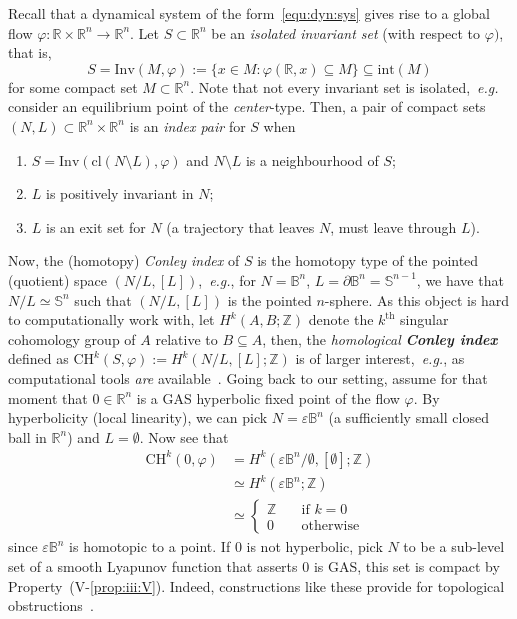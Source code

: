 \documentclass[letterpaper, 10 pt, conference]{ieeeconf}  %
\theoremstyle{mystyle}
\begin{document}
Recall that a dynamical system of the form~\eqref{equ:dyn:sys} gives rise to a global flow $\varphi:\mathbb{R}\times \mathbb{R}^n\to \mathbb{R}^n$. Let $S\subset \mathbb{R}^n$ be an \textit{isolated invariant set} (with respect to $\varphi)$, that is,
\begin{equation*}
    S = \mathrm{Inv}(M,\varphi):=\{x\in M:\varphi(\mathbb{R},x)\subseteq M\}\subseteq \mathrm{int}(M)
\end{equation*}
for some compact set $M\subset \mathbb{R}^n$. Note that not every invariant set is isolated,~\textit{e.g.} consider an equilibrium point of the \textit{center}-type. Then, a pair of compact sets $(N,L)\subset \mathbb{R}^n\times \mathbb{R}^n$ is an \textit{index pair} for $S$ when
\begin{enumerate}[({I}-i)]
    \item $S=\mathrm{Inv}(\mathrm{cl}(N\setminus L),\varphi)$ and $N\setminus L$ is a neighbourhood of $S$;
    \item $L$ is positively invariant in $N$;
    \item $L$ is an exit set for $N$ (a trajectory that leaves $N$, must leave through $L$).
\end{enumerate}
Now, the (homotopy) \textit{Conley index} of $S$ is the homotopy type of the pointed (quotient) space $(N/L,[L])$,~\textit{e.g.}, for $N=\mathbb{B}^n$, $L=\partial \mathbb{B}^n=\mathbb{S}^{n-1}$, we have that $N/L\simeq \mathbb{S}^n$ such that $(N/L,[L])$ is the pointed $n$-sphere. As this object is hard to computationally work with, let $H^k(A,B;\mathbb{Z})$ denote the $k^{\mathrm{th}}$ singular cohomology group of $A$ relative to $B\subseteq A$, then, the \textit{homological} \textbf{\textit{Conley index}} defined as $\mathrm{CH}^k(S,\varphi):=H^k(N/L,[L];\mathbb{Z})$ is of larger interest,~\textit{e.g.}, as computational tools \textit{are} available~\cite{ref:kaczynski2004computational}. Going back to our setting, assume for that moment that $0\in \mathbb{R}^n$ is a GAS hyperbolic fixed point of the flow $\varphi$. By hyperbolicity (local linearity), we can pick $N=\varepsilon\mathbb{B}^n$ (a sufficiently small closed ball in $\mathbb{R}^n$) and $L=\emptyset$. Now see that
\begin{equation*}
\begin{aligned}
\mathrm{CH}^k(0,\varphi)&=H^k(\varepsilon\mathbb{B}^n/\emptyset,[\emptyset];\mathbb{Z})\\
        &\simeq H^k(\varepsilon\mathbb{B}^n;\mathbb{Z})\\
        &\simeq \begin{cases}
        \mathbb{Z}\quad & \text{if }k=0\\
        0\quad & \text{otherwise}
    \end{cases}
\end{aligned}
\end{equation*}
since $\varepsilon\mathbb{B}^n$ is homotopic to a point. If $0$ is not hyperbolic, pick $N$ to be a sub-level set of a smooth Lyapunov function that asserts $0$ is GAS, this set is compact by Property~(V-\ref{prop:iii:V}). Indeed, constructions like these provide for topological obstructions~\cite{ref:moulay2011conley}. 
\end{document}
